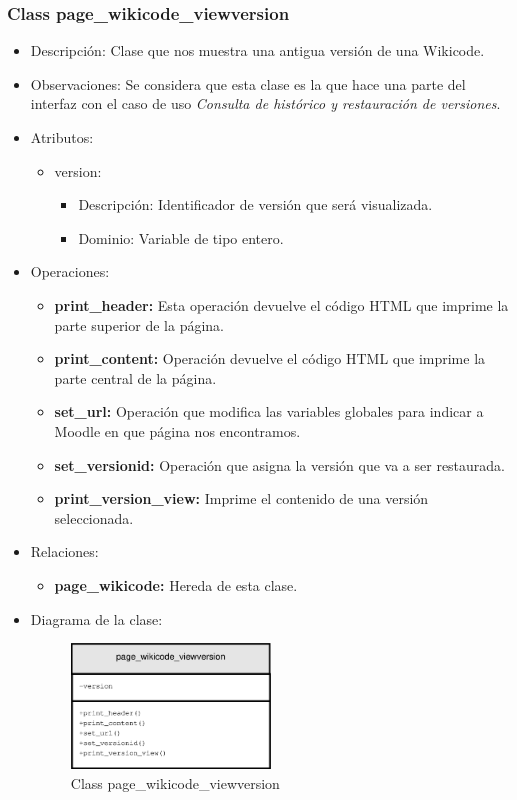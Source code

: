 \subsubsection{Class page\_wikicode\_viewversion}

\begin{itemize}
	\item Descripción: Clase que nos muestra una antigua versión de una Wikicode.
	\item Observaciones: Se considera que esta clase es la que hace una parte del interfaz con el caso de uso \emph{Consulta de histórico y restauración de versiones}.
	\item Atributos:
		\begin{itemize}
			\item version:
				\begin{itemize}
					\item Descripción: Identificador de versión que será visualizada.
					\item Dominio: Variable de tipo entero.
				\end{itemize}
		\end{itemize}
	\item Operaciones:
		\begin{itemize}
			\item \textbf{print\_header: }Esta operación devuelve el código HTML que imprime la parte superior de la página.
			\item \textbf{print\_content: }Operación devuelve el código HTML que imprime la parte central de la página.
			\item \textbf{set\_url: }Operación que modifica las variables globales para indicar a Moodle en que página nos encontramos.
			\item \textbf{set\_versionid: }Operación que asigna la versión que va a ser restaurada.
			\item \textbf{print\_version\_view: }Imprime el contenido de una versión seleccionada.
		\end{itemize}
	\item Relaciones:
		\begin{itemize}
			\item \textbf{page\_wikicode:} Hereda de esta clase.
		\end{itemize}
	\item Diagrama de la clase:
		\begin{figure}[h]
			\centering
			\includegraphics[width=0.5\textwidth]{./img/page_wikicode_viewversion.eps}
			\caption{Class page\_wikicode\_viewversion}
		\end{figure}
\end{itemize}

